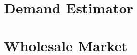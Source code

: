 \section{Demand Estimator}%
\label{sec:demand_estimator}

\section{Wholesale Market}%
\label{sec:wholesale_market}



